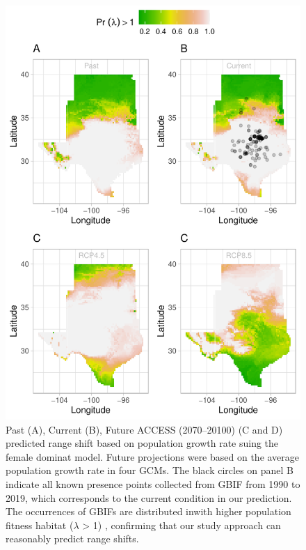 \documentclass[12pt]{article}
\begin{document}
\begin{figure}[H]
  \begin{center}
    \includegraphics[width=0.78\linewidth]{Figures/Fig_geoPrlambdaprojection_fd_acc.pdf}
  \caption{Past (A), Current (B), Future ACCESS (2070–20100) (C and D) predicted range shift based on population growth rate suing the female dominat model. Future projections were based on the average population growth rate in four GCMs. The black circles on panel B indicate all known presence points collected from GBIF from 1990 to 2019, which corresponds to the current condition in our prediction.  The occurrences of GBIFs are distributed inwith higher population fitness habitat ($\lambda$ > 1) , confirming that our study approach can reasonably predict range shifts. }
  \label{Sup:geoprojaccfd}
  \end{center}
\end{figure}
\end{document}
